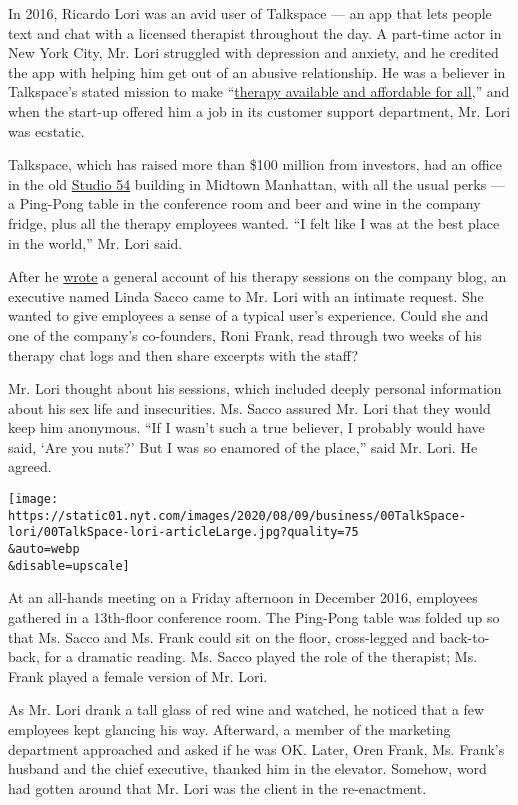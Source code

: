 In 2016, Ricardo Lori was an avid user of Talkspace --- an app that lets
people text and chat with a licensed therapist throughout the day. A
part-time actor in New York City, Mr. Lori struggled with depression and
anxiety, and he credited the app with helping him get out of an abusive
relationship. He was a believer in Talkspace's stated mission to make
``\href{https://help.talkspace.com/hc/en-us?_ga=2.27016189.171121636.1593548307-1918767659.1593034870}{therapy
available and affordable for all},'' and when the start-up offered him a
job in its customer support department, Mr. Lori was ecstatic.

Talkspace, which has raised more than \$100 million from investors, had
an office in the old
\href{https://www.nytimes.com/2018/10/04/movies/studio-54-review.html}{Studio
54} building in Midtown Manhattan, with all the usual perks --- a
Ping-Pong table in the conference room and beer and wine in the company
fridge, plus all the therapy employees wanted. ``I felt like I was at
the best place in the world,'' Mr. Lori said.

After he
\href{https://www.talkspace.com/blog/ricardo-used-talkspace-overcome-depression-anxiety-abuse/}{wrote}
a general account of his therapy sessions on the company blog, an
executive named Linda Sacco came to Mr. Lori with an intimate request.
She wanted to give employees a sense of a typical user's experience.
Could she and one of the company's co-founders, Roni Frank, read through
two weeks of his therapy chat logs and then share excerpts with the
staff?

Mr. Lori thought about his sessions, which included deeply personal
information about his sex life and insecurities. Ms. Sacco assured Mr.
Lori that they would keep him anonymous. ``If I wasn't such a true
believer, I probably would have said, `Are you nuts?' But I was so
enamored of the place,'' said Mr. Lori. He agreed.

\texttt{[image: https://static01.nyt.com/images/2020/08/09/business/00TalkSpace-lori/00TalkSpace-lori-articleLarge.jpg?quality=75\\\&auto=webp\\\&disable=upscale]}

At an all-hands meeting on a Friday afternoon in December 2016,
employees gathered in a 13th-floor conference room. The Ping-Pong table
was folded up so that Ms. Sacco and Ms. Frank could sit on the floor,
cross-legged and back-to-back, for a dramatic reading. Ms. Sacco played
the role of the therapist; Ms. Frank played a female version of Mr.
Lori.

As Mr. Lori drank a tall glass of red wine and watched, he noticed that
a few employees kept glancing his way. Afterward, a member of the
marketing department approached and asked if he was OK. Later, Oren
Frank, Ms. Frank's husband and the chief executive, thanked him in the
elevator. Somehow, word had gotten around that Mr. Lori was the client
in the re-enactment.

